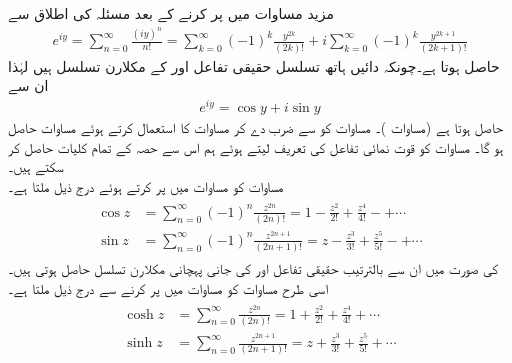 مزید مساوات  میں  پر کرنے کے بعد مسئلہ  کی اطلاق سے
\begin{align*}
e^{iy}=\sum\limits_{n=0}^{\infty} \frac{(iy)^n}{n!}=\sum\limits_{k=0}^{\infty}(-1)^k\frac{y^{2k}}{(2k)!}+i\sum\limits_{k=0}^{\infty}(-1)^k\frac{y^{2k+1}}{(2k+1)!}
\end{align*}
حاصل ہوتا ہے۔چونکہ دائیں ہاتھ تسلسل  حقیقی تفاعل  اور  کے مکلارن تسلسل ہیں لہٰذا ان سے 
\begin{align}\label{مساوات_ٹیلر_یولر_کلیہ}
e^{iy}=\cos y+i\sin y
\end{align}
حاصل ہوتا ہے (مساوات )۔ مساوات  کو  سے ضرب دے کر مساوات  کا استعمال کرتے ہوئے مساوات  حاصل ہو گا۔ مساوات  کو قوت نمائی تفاعل کی تعریف  لیتے ہوئے ہم اس سے حصہ  کے تمام کلیات حاصل کر سکتے ہیں۔
\quad {}\\
مساوات  کو مساوات  میں پر کرتے ہوئے درج ذیل ملتا ہے۔
\begin{gather}
\begin{aligned}\label{مساوات_ٹیلر_تکونیاتی_تفاعل}
\cos z&=\sum\limits_{n=0}^{\infty} (-1)^n\frac{z^{2n}}{(2n)!}=1-\frac{z^2}{2!}+\frac{z^4}{4!}-+\cdots\\
\sin z&=\sum\limits_{n=0}^{\infty} (-1)^n\frac{z^{2n+1}}{(2n+1)!}=z-\frac{z^3}{3!}+\frac{z^5}{5!}-+\cdots
\end{aligned}
\end{gather}
 کی صورت میں ان سے بالترتیب حقیقی تفاعل  اور  کی جانی پہچانی مکلارن تسلسل حاصل ہوتی ہیں۔اسی طرح مساوات  کو مساوات  میں پر کرنے سے درج ذیل ملتا ہے۔
\begin{gather}
\begin{aligned}\label{مساوات_ٹیلر_ہذلولی_تفاعل}
\cosh z&=\sum\limits_{n=0}^{\infty} \frac{z^{2n}}{(2n)!}=1+\frac{z^2}{2!}+\frac{z^4}{4!}+\cdots\\
\sinh z&=\sum\limits_{n=0}^{\infty} \frac{z^{2n+1}}{(2n+1)!}=z+\frac{z^3}{3!}+\frac{z^5}{5!}+\cdots
\end{aligned}
\end{gather}
